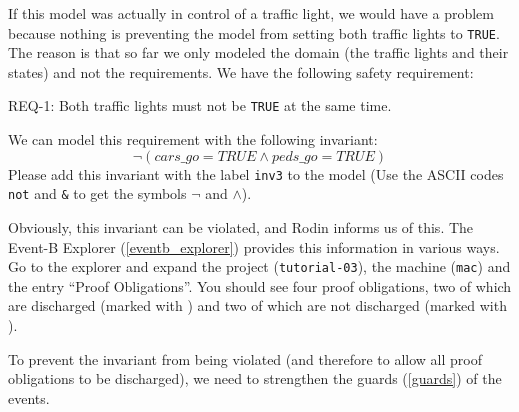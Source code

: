 If this model was actually in control of a traffic light, we would have a problem because nothing is preventing the model from setting both traffic lights to \texttt{TRUE}.  The reason is that so far we only modeled the domain (the traffic lights and their states) and not the requirements.  We have the following safety requirement:

\begin{center}REQ-1: Both traffic lights must not be \texttt{TRUE} at the same time.\end{center}

We can model this requirement with the following invariant:
\[
\lnot  (cars\_go = TRUE \land  peds\_go = TRUE)
\]
Please add this invariant with the label \texttt{inv3} to the model (Use the ASCII codes \texttt{not} and \texttt{\&} to get the symbols $\lnot$ and $\land$).

Obviously, this invariant can be violated, and Rodin informs us of this.  The \textsf{Event-B Explorer} (\ref{eventb_explorer}) provides this information in various ways.  Go to the explorer and expand the project (\texttt{tutorial-03}), the machine (\texttt{mac}) and the entry ``Proof Obligations''.
You should see four proof obligations, two of which are discharged (marked with ) and two of which are not discharged (marked with ).


To prevent the invariant from being violated (and therefore to allow all proof obligations to be discharged), we need to strengthen the guards (\ref{guards}) of the events.

